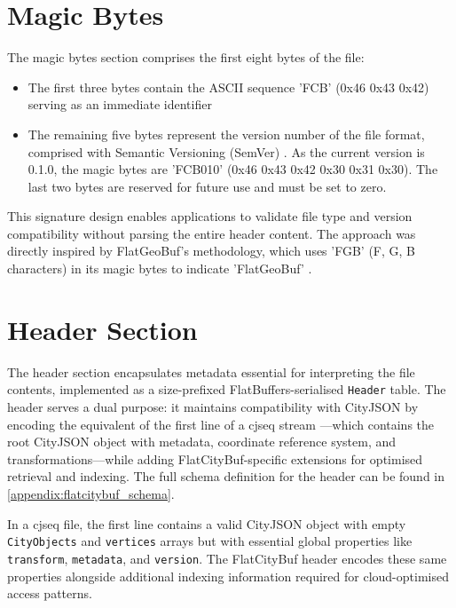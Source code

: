 \section{Magic Bytes}
\label{methodology:file_components:magic_bytes}

The magic bytes section comprises the first eight bytes of the file:
\begin{itemize}
  \item The first three bytes contain the ASCII sequence 'FCB' (0x46 0x43 0x42) serving as an immediate identifier
  \item The remaining five bytes represent the version number of the file format, comprised with Semantic Versioning (SemVer) \citep{semver}. As the current version is 0.1.0, the magic bytes are 'FCB010' (0x46 0x43 0x42 0x30 0x31 0x30). The last two bytes are reserved for future use and must be set to zero.
\end{itemize}

This signature design enables applications to validate file type and version compatibility without parsing the entire header content. The approach was directly inspired by FlatGeoBuf's methodology, which uses 'FGB' (F, G, B characters) in its magic bytes to indicate 'FlatGeoBuf' \citep{horance_2022_detail}.

\section{Header Section}
\label{methodology:file_components:header}

The header section encapsulates metadata essential for interpreting the file contents, implemented as a size-prefixed FlatBuffers-serialised \texttt{Header} table. The header serves a dual purpose: it maintains compatibility with CityJSON by encoding the equivalent of the first line of a \ac{cjseq} stream \citep{ledoux_2024}—which contains the root CityJSON object with metadata, coordinate reference system, and transformations—while adding FlatCityBuf-specific extensions for optimised retrieval and indexing. The full schema definition for the header can be found in \autoref{appendix:flatcitybuf_schema}.

In a \ac{cjseq} file, the first line contains a valid CityJSON object with empty \texttt{CityObjects} and \texttt{vertices} arrays but with essential global properties like \texttt{transform}, \texttt{metadata}, and \texttt{version}. The FlatCityBuf header encodes these same properties alongside additional indexing information required for cloud-optimised access patterns.

